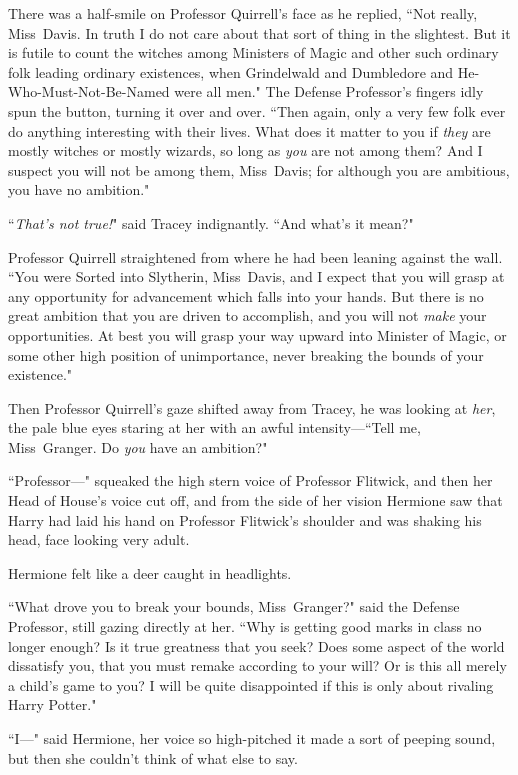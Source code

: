 There was a half-smile on Professor Quirrell's face as he replied, ``Not really, Miss~Davis. In truth I do not care about that sort of thing in the slightest. But it is futile to count the witches among Ministers of Magic and other such ordinary folk leading ordinary existences, when Grindelwald and Dumbledore and He-Who-Must-Not-Be-Named were all men." The Defense Professor's fingers idly spun the button, turning it over and over. ``Then again, only a very few folk ever do anything interesting with their lives. What does it matter to you if \emph{they} are mostly witches or mostly wizards, so long as \emph{you} are not among them? And I suspect you will not be among them, Miss~Davis; for although you are ambitious, you have no ambition."

``\emph{That's not true!}" said Tracey indignantly. ``And what's it mean?"

Professor Quirrell straightened from where he had been leaning against the wall. ``You were Sorted into Slytherin, Miss~Davis, and I expect that you will grasp at any opportunity for advancement which falls into your hands. But there is no great ambition that you are driven to accomplish, and you will not \emph{make} your opportunities. At best you will grasp your way upward into Minister of Magic, or some other high position of unimportance, never breaking the bounds of your existence."

Then Professor Quirrell's gaze shifted away from Tracey, he was looking at \emph{her}, the pale blue eyes staring at her with an awful intensity—``Tell me, Miss~Granger. Do \emph{you} have an ambition?"

``Professor—" squeaked the high stern voice of Professor Flitwick, and then her Head of House's voice cut off, and from the side of her vision Hermione saw that Harry had laid his hand on Professor Flitwick's shoulder and was shaking his head, face looking very adult.

Hermione felt like a deer caught in headlights.

``What drove you to break your bounds, Miss~Granger?" said the Defense Professor, still gazing directly at her. ``Why is getting good marks in class no longer enough? Is it true greatness that you seek? Does some aspect of the world dissatisfy you, that you must remake according to your will? Or is this all merely a child's game to you? I will be quite disappointed if this is only about rivaling Harry Potter."

``I—" said Hermione, her voice so high-pitched it made a sort of peeping sound, but then she couldn't think of what else to say.

